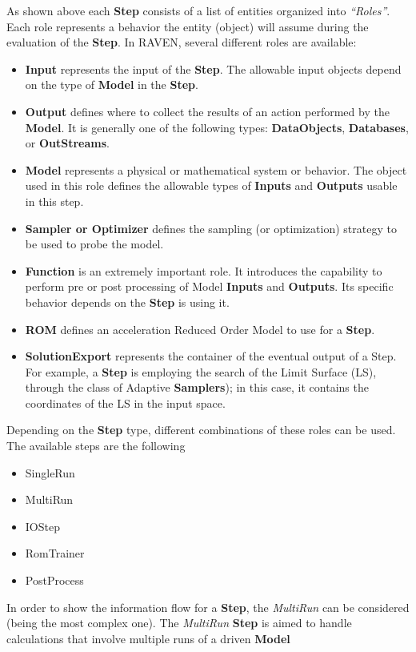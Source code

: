 As shown above each \textbf{Step} consists of
a list of entities organized into \textit{``Roles''}.
%
Each role represents a behavior the entity (object) will assume during the
evaluation of the \textbf{Step}.
%
In RAVEN, several different roles are available:
\begin{itemize}
\item \textbf{Input} represents the input of the \textbf{Step}.
The allowable input objects depend on the type of \textbf{Model} in the
\textbf{Step}.
\item \textbf{Output} defines where to collect the results of an action
performed by the \textbf{Model}.
It is generally one of the following types: \textbf{DataObjects}, \textbf{Databases},
or \textbf{OutStreams}.
\item \textbf{Model} represents a physical or mathematical system or behavior.
The object used in this role defines the allowable types of
\textbf{Inputs} and \textbf{Outputs} usable in this step.
\item \textbf{Sampler or Optimizer} defines the sampling (or optimization) strategy to be used to probe the model.
\item \textbf{Function} is an extremely important role. It introduces the capability to
perform pre or post processing of Model \textbf{Inputs} and \textbf{Outputs}. Its specific
behavior depends on the \textbf{Step} is using it.
\item \textbf{ROM} defines an acceleration Reduced Order Model to use for a
\textbf{Step}.
\item \textbf{SolutionExport} represents the container of the eventual output
of a Step. For example, a \textbf{Step} is employing the
search of the Limit Surface (LS), through the class of Adaptive \textbf{Samplers}); in this case, it
contains the coordinates of the LS in the input space.
\end{itemize}
Depending on the \textbf{Step} type, different combinations of these roles can
be used.
The available steps are the following
\begin{itemize}
\item SingleRun
\item MultiRun
\item IOStep
\item RomTrainer
\item PostProcess
\end{itemize}
In order to show the information flow for a  \textbf{Step}, the  \textit{MultiRun} can be considered (being the most complex 
one). The  \textit{MultiRun} \textbf{Step} is aimed to handle calculations that involve multiple runs of a driven \textbf{Model} 
